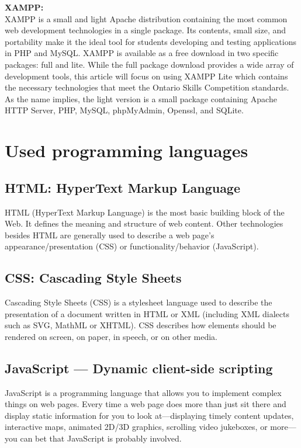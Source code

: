  \textbf{\noindent XAMPP:\\}
 \indent XAMPP is a small and light Apache distribution containing the most common web development
 technologies in a single package. Its contents, small size, and portability make it the ideal tool for
 students developing and testing applications in PHP and MySQL. XAMPP is available as a free
 download in two specific packages: full and lite. While the full package download provides a wide
 array of development tools, this article will focus on using XAMPP Lite which contains the necessary
 technologies that meet the Ontario Skills Competition standards. As the name implies, the light version
 is a small package containing Apache HTTP Server, PHP, MySQL, phpMyAdmin, Openssl, and
 SQLite.\cite{dvorski2007installing}\\



\newpage


\section{Used programming languages}


\subsection{HTML: HyperText Markup Language}
HTML (HyperText Markup Language) is the most basic building block of the Web. It defines the meaning and structure of web content. Other technologies besides HTML are generally used to describe a web page's appearance/presentation (CSS) or functionality/behavior (JavaScript).\cite{MDN-HTML}\\

\subsection{CSS: Cascading Style Sheets}
Cascading Style Sheets (CSS) is a stylesheet language used to describe the presentation of a document written in HTML or XML (including XML dialects such as SVG, MathML or XHTML). CSS describes how elements should be rendered on screen, on paper, in speech, or on other media.\cite{MDN-CSS}\\

\subsection{JavaScript — Dynamic client-side scripting}
JavaScript is a programming language that allows you to implement complex things on web pages. Every time a web page does more than just sit there and display static information for you to look at—displaying timely content updates, interactive maps, animated 2D/3D graphics, scrolling video jukeboxes, or more—you can bet that JavaScript is probably involved.\cite{MDN-JS}\\

